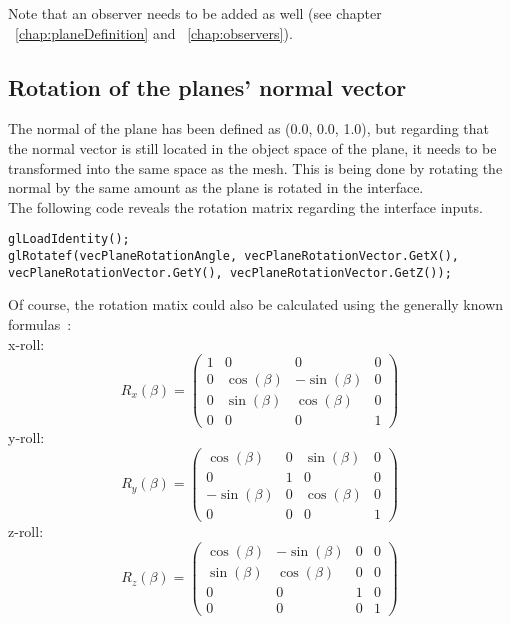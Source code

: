 Note that an observer needs to be added as well (see chapter ~\ref{chap:planeDefinition} and ~\ref{chap:observers}).

\subsection{Rotation of the planes' normal vector}
The normal of the plane has been defined as (0.0, 0.0, 1.0), but regarding that the normal vector is still located in the object space of the plane, it needs to be transformed into the same space as the mesh. This is being done by rotating the normal by the same amount as the plane is rotated in the interface.\\
The following code reveals the rotation matrix regarding the interface inputs.
\begin{lstlisting}
glLoadIdentity();
glRotatef(vecPlaneRotationAngle, vecPlaneRotationVector.GetX(), vecPlaneRotationVector.GetY(), vecPlaneRotationVector.GetZ());
\end{lstlisting}
Of course, the rotation matix could also be calculated using the generally known formulas~\cite{book:computerGraphicsHill}:\\ %
\newline
x-roll:
\begin{equation}
R_{x}(\beta) = 
\begin{pmatrix} 
	1 & 0 & 0 & 0 \\ 
	0 & \cos(\beta) & -\sin(\beta) & 0 \\ 
	0 & \sin(\beta) & \cos(\beta) & 0 \\ 
	0 & 0 & 0 & 1 
\end{pmatrix}
\end{equation}
\newline
y-roll:\\
\begin{equation}
R_{y}(\beta) =
\begin{pmatrix} 
	\cos(\beta) & 0 & \sin(\beta) & 0 \\
	0 & 1 & 0 & 0 \\
	-\sin(\beta) & 0 & \cos(\beta) & 0 \\
	0 & 0 & 0 & 1
\end{pmatrix}
\end{equation}
\newline
z-roll:\\
\begin{equation}
R_{z}(\beta) =
\begin{pmatrix} 
	\cos(\beta) & -\sin(\beta) & 0 & 0 \\
	\sin(\beta) & \cos(\beta) & 0 & 0 \\
	0 & 0 & 1 & 0 \\
	0 & 0 & 0 & 1
\end{pmatrix}
\end{equation}
